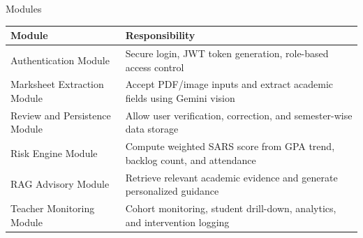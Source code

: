 \documentclass[aspectratio=169]{beamer}
\begin{document}
\begin{frame}{Modules}
  \small
  \begin{tabularx}{\textwidth}{>{\raggedright\arraybackslash}p{}X}
    \toprule
    \textbf{Module} & \textbf{Responsibility} \\
    \midrule
    Authentication Module & Secure login, JWT token generation, role-based access control \\
    Marksheet Extraction Module & Accept PDF/image inputs and extract academic fields using Gemini vision \\
    Review and Persistence Module & Allow user verification, correction, and semester-wise data storage \\
    Risk Engine Module & Compute weighted SARS score from GPA trend, backlog count, and attendance \\
    RAG Advisory Module & Retrieve relevant academic evidence and generate personalized guidance \\
    Teacher Monitoring Module & Cohort monitoring, student drill-down, analytics, and intervention logging \\
    \bottomrule
  \end{tabularx}
\end{frame}
\end{document}
